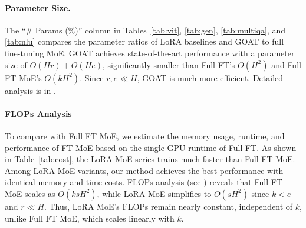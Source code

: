 \begin{table}[h]
\vspace{-10pt}
\centering
\caption{Comparison of LoRA-MoE and Full FT MoE in memory cost, training time, and GSM8K performance. Memory cost was measured and training time was recorded on the MetaMath dataset using one A100 GPU with identical batch sizes.\label{tab:comparison-goat}}
\label{tab:cost}
\vspace{-15pt}
\end{table}

\paragraph{Parameter Size.}
The “\# Params (\%)” column in Tables~\ref{tab:vit}, \ref{tab:gen}, \ref{tab:multiqa}, and \ref{tab:nlu} compares the parameter ratios of LoRA baselines and GOAT to full fine-tuning MoE. GOAT achieves state-of-the-art performance with a parameter size of \(O(Hr) + O(He)\), significantly smaller than Full FT's \(O(H^2)\) and Full FT MoE's \(O(kH^2)\). Since \(r, e \ll H\), GOAT is much more efficient. Detailed analysis is in .

\paragraph{FLOPs Analysis} 
To compare with Full FT MoE, we estimate the memory usage, runtime, and performance of FT MoE based on the single GPU runtime of Full FT.
As shown in Table~\ref{tab:cost}, the LoRA-MoE series trains much faster than Full FT MoE. Among LoRA-MoE variants, our method achieves the best performance with identical memory and time costs.  
FLOPs analysis (see ) reveals that Full FT MoE scales as \(O(ksH^2)\), while LoRA MoE simplifies to \(O(sH^2)\) since \(k < e\) and \(r \ll H\). Thus, LoRA MoE's FLOPs remain nearly constant, independent of \(k\), unlike Full FT MoE, which scales linearly with \(k\).
 

